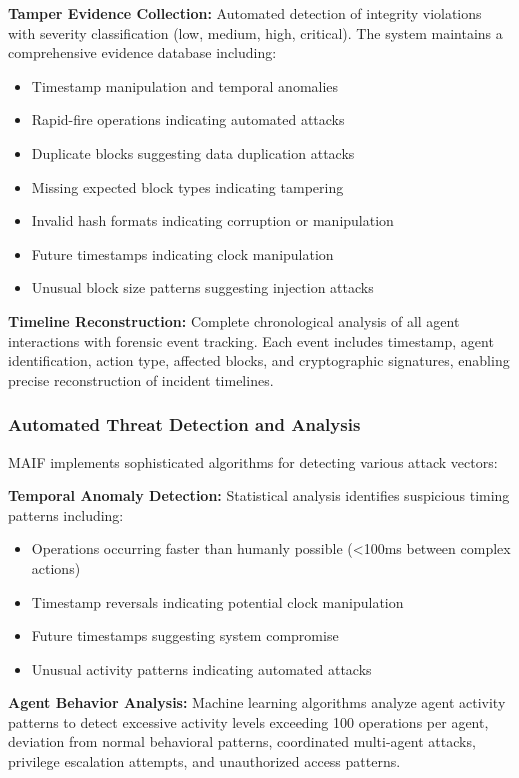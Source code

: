 \documentclass[conference]{IEEEtran}
\begin{document}
\textbf{Tamper Evidence Collection:} Automated detection of integrity violations with severity classification (low, medium, high, critical). The system maintains a comprehensive evidence database including:
\begin{itemize}[leftmargin=*]
\item Timestamp manipulation and temporal anomalies
\item Rapid-fire operations indicating automated attacks
\item Duplicate blocks suggesting data duplication attacks
\item Missing expected block types indicating tampering
\item Invalid hash formats indicating corruption or manipulation
\item Future timestamps indicating clock manipulation
\item Unusual block size patterns suggesting injection attacks
\end{itemize}

\textbf{Timeline Reconstruction:} Complete chronological analysis of all agent interactions with forensic event tracking. Each event includes timestamp, agent identification, action type, affected blocks, and cryptographic signatures, enabling precise reconstruction of incident timelines.

\subsubsection{Automated Threat Detection and Analysis}

MAIF implements sophisticated algorithms for detecting various attack vectors:

\textbf{Temporal Anomaly Detection:} Statistical analysis identifies suspicious timing patterns including:
\begin{itemize}[leftmargin=*]
\item Operations occurring faster than humanly possible (<100ms between complex actions)
\item Timestamp reversals indicating potential clock manipulation
\item Future timestamps suggesting system compromise
\item Unusual activity patterns indicating automated attacks
\end{itemize}

\textbf{Agent Behavior Analysis:} Machine learning algorithms analyze agent activity patterns to detect excessive activity levels exceeding 100 operations per agent, deviation from normal behavioral patterns, coordinated multi-agent attacks, privilege escalation attempts, and unauthorized access patterns.
\end{document}
